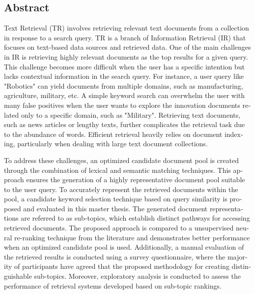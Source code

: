 \begin{otherlanguage}{english}
    \section*{Abstract}

Text Retrieval (TR) involves retrieving relevant text documents from a collection in response to a search query. \ac{TR} is a branch of Information Retrieval (IR) that focuses on text-based data sources and retrieved data. One of the main challenges in \ac{IR} is retrieving highly relevant documents as the top results for a given query. This challenge becomes more difficult when the user has a specific intention but lacks contextual information in the search query. For instance, a user query like "Robotics" can yield documents from multiple domains, such as manufacturing, agriculture, military, etc. A simple keyword search can overwhelm the user with many false positives when the user wants to explore the innovation documents related only to a specific domain, such as "Military". Retrieving text documents, such as news articles or lengthy texts, further complicates the retrieval task due to the abundance of words. Efficient retrieval heavily relies on document indexing, particularly when dealing with large text document collections.

To address these challenges, an optimized candidate document pool is created through the combination of lexical and semantic matching techniques. This approach ensures the generation of a highly representative document pool suitable to the user query. To accurately represent the retrieved documents within the pool, a candidate keyword selection technique based on query similarity is proposed and evaluated in this master thesis. The generated document representations are referred to as sub-topics, which establish distinct pathways for accessing retrieved documents. The proposed approach is compared to a unsupervised neural re-ranking technique from the literature and demonstrates better performance when an optimized candidate pool is used. Additionally, a manual evaluation of the retrieved results is conducted using a survey questionnaire, where the majority of participants have agreed that the proposed methodology for creating distinguishable sub-topics. Moreover, exploratory analysis is conducted to assess the performance of retrieval systems developed based on sub-topic rankings.


\end{otherlanguage}
